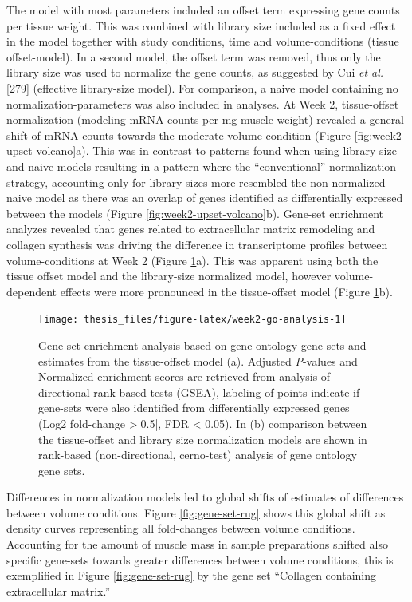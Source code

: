 \documentclass[twoside,10pt]{gihclass} %
\begin{document}
The model with most parameters included an offset term expressing gene counts per tissue weight. This was combined with library size included as a fixed effect in the model together with study conditions, time and volume-conditions (tissue offset-model).
In a second model, the offset term was removed, thus only the library size was used to normalize the gene counts, as suggested by Cui \emph{et al.}
{[}279{]} (effective library-size model).
For comparison, a naive model containing no normalization-parameters was also included in analyses.
At Week 2, tissue-offset normalization (modeling mRNA counts per-mg-muscle weight) revealed a general shift of mRNA counts towards the moderate-volume condition (Figure \ref{fig:week2-upset-volcano}a).
This was in contrast to patterns found when using library-size and naive models resulting in a pattern where the ``conventional'' normalization strategy, accounting only for library sizes more resembled the non-normalized naive model as there was an overlap of genes identified as differentially expressed between the models (Figure \ref{fig:week2-upset-volcano}b).
Gene-set enrichment analyzes revealed that genes related to extracellular matrix remodeling and collagen synthesis was driving the difference in transcriptome profiles between volume-conditions at Week 2
(Figure \ref{fig:week2-go-analysis}a).
This was apparent using both the tissue offset model and the library-size normalized model, however volume-dependent effects were more pronounced in the tissue-offset model
(Figure \ref{fig:week2-go-analysis}b).
\begin{figure}

{\centering \texttt{[image: thesis\_files/figure-latex/week2-go-analysis-1]} 

}

\caption[Gene-set enrichment analysis at Week 2]{Gene-set enrichment analysis based on gene-ontology gene sets and estimates from the tissue-offset model (a). Adjusted \textit{P}-values and Normalized enrichment scores are retrieved from analysis of directional rank-based tests (GSEA), labeling of points indicate if gene-sets were also identified from differentially expressed genes (Log2 fold-change >|0.5|, FDR < 0.05). In (b) comparison between the tissue-offset and library size normalization models are shown in rank-based (non-directional, cerno-test) analysis of gene ontology gene sets.}\label{fig:week2-go-analysis}
\end{figure}
Differences in normalization models led to global shifts of estimates of differences between volume conditions. Figure \ref{fig:gene-set-rug} shows this global shift as density curves representing all fold-changes between volume conditions. Accounting for the amount of muscle mass in sample preparations shifted also specific gene-sets towards greater differences between volume conditions, this is exemplified in Figure \ref{fig:gene-set-rug} by the gene set ``Collagen containing extracellular matrix.''
\end{document}
